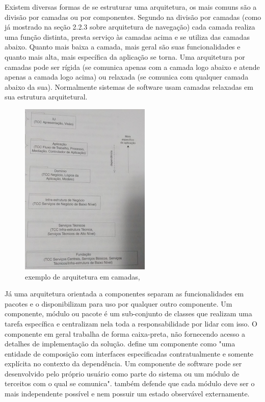 Existem diversas formas de se estruturar uma arquitetura, os mais comuns são a divisão por camadas ou por componentes. Segundo \cite{Larman2005} na divisão por camadas (como já mostrado na seção 2.2.3 sobre arquitetura de navegação) cada camada realiza uma função distinta, presta serviço às camadas acima e se utiliza das camadas abaixo. Quanto mais baixa a camada, mais geral são suas funcionalidades e quanto mais alta, mais específica da aplicação se torna. Uma arquitetura por camadas pode ser rígida (se comunica apenas com a camada logo abaixo e atende apenas a camada logo acima) ou relaxada (se comunica com qualquer camada abaixo da sua). Normalmente sistemas de software usam camadas relaxadas em sua estrutura arquitetural.

\begin{figure}[h]
	\centering
	\label{fig12}
		\includegraphics[keepaspectratio=true,scale=0.5]{figuras/arqcamadas.jpg}
	\caption{exemplo de arquitetura em camadas, \cite{Larman2005}}
\end{figure}

Já uma arquitetura orientada a componentes separam as funcionalidades em pacotes e o disponibilizam para uso por qualquer outro componente. Um componente, módulo ou pacote é um sub-conjunto de classes que realizam uma tarefa específica e centralizam nela toda a responsabilidade por lidar com isso. O componente em geral trabalha de forma caixa-preta, não fornecendo acesso a detalhes de implementação da solução. \cite{Szyperski2002} define um componente como "uma entidade de composição com interfaces especificadas contratualmente e somente explícita no contexto da dependência. Um componente de software pode ser desenvolvido pelo próprio usuário como parte do sistema ou um módulo de terceitos com o qual se comunica". \cite{Szyperski2002} também defende que cada módulo deve ser o mais independente possível e nem possuir um estado observável externamente.

